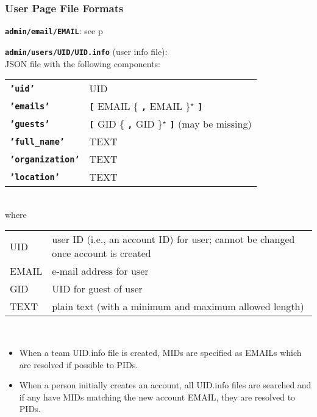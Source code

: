 \documentclass[12pt]{article}
\newenvironment{indpar}[1][0.4in]%
	{\begin{list}{}%
		     {\setlength{\itemsep}{0in}%
		      \setlength{\topsep}{0in}%
		      \setlength{\parsep}{1ex}%
		      \setlength{\labelwidth}{#1}%
		      \setlength{\leftmargin}{#1}%
		      \addtolength{\leftmargin}{\labelsep}}%
	 \item}%
	{\end{list}}
\newenvironment{itemlist}[1][0.2in]%
	{\begin{list}{}{\setlength{\labelwidth}{#1}%
		        \setlength{\leftmargin}{\labelwidth}%
		        \addtolength{\leftmargin}{+0.2in}%
		        \addtolength{\linewidth}{-\labelwidth}%
		        \addtolength{\linewidth}{-0.2in}%
		        \renewcommand{\makelabel}[1]{##1\hfill}}
	 \raggedright}%
	{\end{list}}
\newcommand{\TT}[1]{{\tt \bfseries #1}}
\newcommand{\pagref}[1]{p\pageref{#1}}
\newcommand{\STAR}{{\Large $^\star$}}
\begin{document}
\subsubsection{User Page File Formats}

\begin{indpar}
\begin{itemlist}
\item[\TT{admin/email/EMAIL}:] see \pagref{ADMIN/EMAIL/EMAIL} 
\item[\TT{admin/users/UID/UID.info} (user info file):]~
\label{ADMIN/USERS/UID/UID.INFO} \\
JSON file with the following components:
\begin{tabular}[t]{ll}
\TT{'uid'} & UID \\
\TT{'emails'} & \TT{[} EMAIL \{ \TT{,} EMAIL \}\STAR{} \TT{]} \\
\TT{'guests'} & \TT{[} GID \{ \TT{,} GID \}\STAR{} \TT{]}
                (may be missing) \\
\TT{'full\_name'} & TEXT \\
\TT{'organization'} & TEXT \\
\TT{'location'} & TEXT \\
\end{tabular}
\\
where
\\
\begin{tabular}[t]{lp{4.0in}}
UID & user ID (i.e., an account ID) for user; cannot be changed once
      account is created \\
EMAIL & e-mail address for user \\
GID & UID for guest of user \\
TEXT & plain text (with a minimum and maximum allowed length) \\
\end{tabular}
\\
\begin{itemize}
\item When a team UID.info file is created, MIDs are specified
as EMAILs which are resolved if possible to PIDs.
\item When a person initially creates an account, all
UID.info files are searched and if any have MIDs matching
the new account EMAIL, they are resolved to PIDs.
\end{itemize}


\end{itemlist}
\end{indpar}
\end{document}
